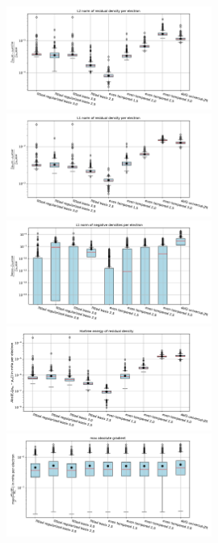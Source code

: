 \begin{figure}
    \centering
    \includegraphics[width=0.6\textwidth]{chapters/results/results_images/L2_residual_densities_on_hartree+external_MOFDFT_for_different_basis_sets}
    \includegraphics[width=0.6\textwidth]{chapters/results/results_images/L1_residual_densities_on_hartree+external_MOFDFT_for_different_basis_sets}
    \includegraphics[width=0.6\textwidth]{chapters/results/results_images/L1_negative_densities_on_hartree+external_MOFDFT_for_different_basis_sets}
    \includegraphics[width=0.6\textwidth]{chapters/results/results_images/L2_residual_hartree_on_hartree+external_MOFDFT_for_different_basis_sets}
    \includegraphics[width=0.6\textwidth]{chapters/results/results_images/max_abs_gradient_on_hartree+external_MOFDFT_for_different_basis_sets}

\end{figure}
